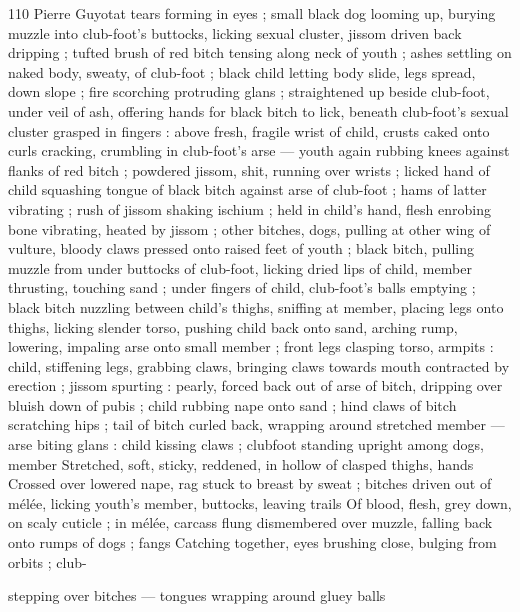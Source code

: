 110 Pierre Guyotat
tears forming in eyes ; small black dog looming up, burying muzzle
into club-foot's buttocks, licking sexual cluster, jissom driven back
dripping ; tufted brush of red bitch tensing along neck of youth ;
ashes settling on naked body, sweaty, of club-foot ; black child
letting body slide, legs spread, down slope ; fire scorching
protruding glans ; straightened up beside club-foot, under veil of
ash, offering hands for black bitch to lick, beneath club-foot's sexual
cluster grasped in fingers : above fresh, fragile wrist of child, crusts
caked onto curls cracking, crumbling in club-foot's arse — youth
again rubbing knees against flanks of red bitch ; powdered jissom,
shit, running over wrists ; licked hand of child squashing tongue of
black bitch against arse of club-foot ; hams of latter vibrating ; rush
of jissom shaking ischium ; held in child's hand, flesh enrobing bone
vibrating, heated by jissom ; other bitches, dogs, pulling at other
wing of vulture, bloody claws pressed onto raised feet of youth ;
black bitch, pulling muzzle from under buttocks of club-foot, licking
dried lips of child, member thrusting, touching sand ; under fingers
of child, club-foot's balls emptying ; black bitch nuzzling between
child's thighs, sniffing at member, placing legs onto thighs, licking
slender torso, pushing child back onto sand, arching rump, lowering,
impaling arse onto small member ; front legs clasping torso, armpits
: child, stiffening legs, grabbing claws, bringing claws towards mouth
contracted by erection ; jissom spurting : pearly, forced back out of
arse of bitch, dripping over bluish down of pubis ; child rubbing
nape onto sand ; hind claws of bitch scratching hips ; tail of bitch
curled back, wrapping around stretched member — arse biting glans
: child kissing claws ; clubfoot standing upright among dogs, member
Stretched, soft, sticky, reddened, in hollow of clasped thighs, hands
Crossed over lowered nape, rag stuck to breast by sweat ; bitches
driven out of mélée, licking youth's member, buttocks, leaving trails
Of blood, flesh, grey down, on scaly cuticle ; in mélée, carcass flung
dismembered over muzzle, falling back onto rumps of dogs ; fangs
Catching together, eyes brushing close, bulging from orbits ; club-

stepping over bitches — tongues wrapping around gluey balls

